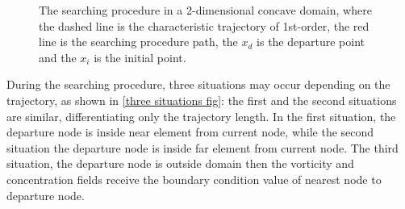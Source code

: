 \begin{figure}[H]
\begin{center}
\end{center}
\caption{
The searching procedure in a 2-dimensional concave domain, 
where the dashed line is the characteristic trajectory of 1st-order,
the red line is the searching procedure path,
the $x_{d}$ is the departure point and
the $x_{i}$ is the initial point.
}
\label{searching procedure fig}
\end{figure}


\medskip
During the searching procedure, three situations may 
occur depending on the trajectory, 
as shown in \ref{three situations fig}: the first and the second 
situations are similar, differentiating only the trajectory length. 
In the first situation, the departure node is inside near 
element from current node, while the second situation 
the departure node is inside far element from current node. 
The third situation, the departure node is outside domain 
then the vorticity and concentration fields receive 
the boundary condition value of nearest node to departure node.


